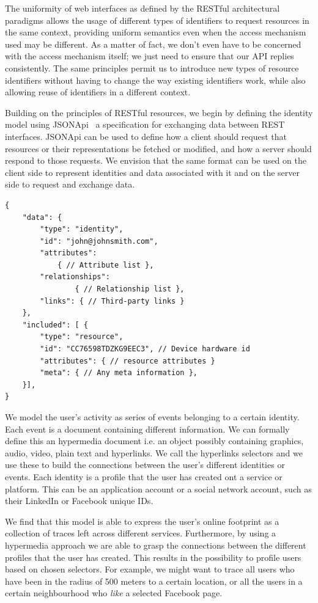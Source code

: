 The uniformity of web interfaces as defined by the RESTful architectural paradigms allows the usage of different types of identifiers to request resources in the same context, providing uniform semantics even when the access mechanism used may be different. As a matter of fact, we don't even have to be concerned with the access mechanism itself; we just need to ensure that our API replies consistently. The same principles permit us to introduce new types of resource identifiers without having to change the way existing identifiers work, while also allowing reuse of identifiers in a different context.

Building on the principles of RESTful resources, we begin by defining the identity model using JSONApi~\cite{Jsonapi} a specification for exchanging data between REST interfaces. JSONApi can be used to define how a client should request that resources or their representations be fetched or modified, and how a server should respond to those requests. We envision that the same format can be used on the client side to represent identities and data associated with it and on the server side to request and exchange data.

\begin{lstlisting}
{
    "data": {
        "type": "identity",
        "id": "john@johnsmith.com",
        "attributes":
            { // Attribute list },
        "relationships":
                { // Relationship list },
        "links": { // Third-party links }
    },
    "included": [ {
        "type": "resource",
        "id": "CC76598TDZKG9EEC3", // Device hardware id
        "attributes": { // resource attributes }
        "meta": { // Any meta information },
    }],
}
\end{lstlisting}

We model the user's activity as series of events belonging to a certain identity. Each event is a document containing different information. We can formally define this an hypermedia document i.e. an object possibly containing graphics, audio, video, plain text and hyperlinks. We call the hyperlinks selectors and we use these to build the connections between the user's different identities or events. Each identity is a profile that the user has created ont a service or platform. This can be an application account or a social network account, such as their LinkedIn or Facebook unique IDs.

We find that this model is able to express the user's online footprint as a collection of traces left across different services. Furthermore, by using a hypermedia approach we are able to grasp the connections between the different profiles that the user has created. This results in the possibility to profile users based on chosen selectors. For example, we might want to trace all users who have been in the radius of 500 meters to a certain location, or all the users in a certain neighbourhood who \emph{like} a selected Facebook page.

